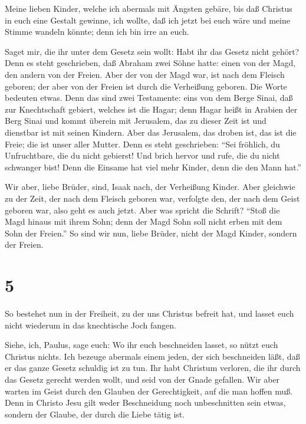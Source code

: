  Meine lieben Kinder, welche ich abermals mit Ängsten
gebäre, bis daß Christus in euch eine Gestalt gewinne,  ich
wollte, daß ich jetzt bei euch wäre und meine Stimme wandeln könnte;
denn ich bin irre an euch.

 Saget mir, die ihr unter dem Gesetz sein wollt: Habt ihr
das Gesetz nicht gehört?  Denn es steht geschrieben, daß
Abraham zwei Söhne hatte: einen von der Magd, den andern von der Freien.
 Aber der von der Magd war, ist nach dem Fleisch geboren;
der aber von der Freien ist durch die Verheißung geboren. 
Die Worte bedeuten etwas. Denn das sind zwei Testamente: eins von dem
Berge Sinai, daß zur Knechtschaft gebiert, welches ist die Hagar;
 denn Hagar heißt in Arabien der Berg Sinai und kommt
überein mit Jerusalem, das zu dieser Zeit ist und dienstbar ist mit
seinen Kindern.  Aber das Jerusalem, das droben ist, das
ist die Freie; die ist unser aller Mutter.  Denn es steht
geschrieben: ``Sei fröhlich, du Unfruchtbare, die du nicht gebierst! Und
brich hervor und rufe, die du nicht schwanger bist! Denn die Einsame hat
viel mehr Kinder, denn die den Mann hat.''

 Wir aber, liebe Brüder, sind, Isaak nach, der Verheißung
Kinder.  Aber gleichwie zu der Zeit, der nach dem Fleisch
geboren war, verfolgte den, der nach dem Geist geboren war, also geht es
auch jetzt.  Aber was spricht die Schrift? ``Stoß die Magd
hinaus mit ihrem Sohn; denn der Magd Sohn soll nicht erben mit dem Sohn
der Freien.''  So sind wir nun, liebe Brüder, nicht der
Magd Kinder, sondern der Freien.

\hypertarget{section-4}{%
\section{5}\label{section-4}}

 So bestehet nun in der Freiheit, zu der uns Christus
befreit hat, und lasset euch nicht wiederum in das knechtische Joch
fangen.

 Siehe, ich, Paulus, sage euch: Wo ihr euch beschneiden
lasset, so nützt euch Christus nichts.  Ich bezeuge abermals
einem jeden, der sich beschneiden läßt, daß er das ganze Gesetz schuldig
ist zu tun.  Ihr habt Christum verloren, die ihr durch das
Gesetz gerecht werden wollt, und seid von der Gnade gefallen.
 Wir aber warten im Geist durch den Glauben der
Gerechtigkeit, auf die man hoffen muß.  Denn in Christo Jesu
gilt weder Beschneidung noch unbeschnitten sein etwas, sondern der
Glaube, der durch die Liebe tätig ist.


